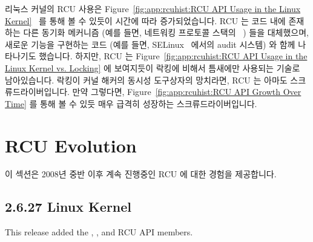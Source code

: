 리눅스 커널의 RCU 사용은
Figure~\ref{fig:app:rcuhist:RCU API Usage in the Linux Kernel}~\cite{PaulEMcKenneyRCUusagePage}
를 통해 볼 수 있듯이 시간에 따라 증가되었습니다.
RCU 는 코드 내에 존재하는 다른 동기화 메커니즘 (예를 들면, 네트워킹 프로토콜
스택의 ~\cite{Molnar00a,Torvalds2.5.69,Torvalds2.5.70}) 들을
대체했으며, 새로운 기능을 구현하는 코드 (예를 들면,
SELinux~\cite{JamesMorris04b} 에서의 audit 시스템) 와 함께 나타나기도 했습니다.
하지만, RCU 는
Figure~\ref{fig:app:rcuhist:RCU API Usage in the Linux Kernel vs. Locking} 에
보여지듯이 락킹에 비해서 틈새에만 사용되는 기술로 남아있습니다.
락킹이 커널 해커의 동시성 도구상자의 망치라면, RCU 는 아마도
스크류드라이버입니다.
만약 그렇다면,
Figure~\ref{fig:app:rcuhist:RCU API Growth Over Time} 를 통해 볼 수 있듯 매우
급격히 성장하는 스크류드라이버입니다.

\section{RCU Evolution}
\label{sec:app:rcuhist:RCU Evolution}

이 섹션은 2008년 중반 이후 계속 진행중인 RCU 에 대한 경험을 제공합니다.

\subsection{2.6.27 Linux Kernel}

This release added the
,
, and
 RCU API members.

